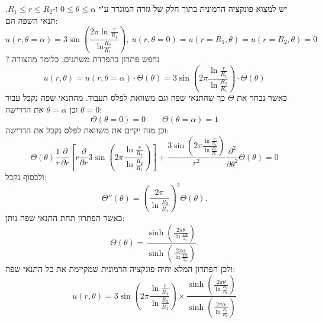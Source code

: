 \documentclass{tstextbook}
\begin{document}
יש למצוא פונקציה הרמונית בתוך חלק של גזרה המוגדר ע"י \(0\leq \theta \leq \alpha\) ו-\(R_{1}\leq r\leq R_{2}\). תנאי השפה הם:
$$ u(r,\theta=\alpha)=3\sin\left(\frac{2\pi\ln\frac r{R_1}}{\mathrm{ln}\frac{R_2}{R_1}}\right),\:u(r,\theta=0)=u(r=R_1,\theta)=u(r=R_2,\theta)=0$$
?
נחפש פתרון בהפרדת משתנים, כלומר מהצורה
$$u\left( r,\theta \right)=u\left( r,\theta=\alpha \right)\cdot\Theta\left( \theta \right)=3\sin\left(2\pi\frac{\ln\frac{r}{R_{1}}}{\ln\frac{R_{2}}{R_{1}}}\right)\cdot\Theta\left(\theta\right)$$
כאשר נבחר את \(\Theta\) כך שהתנאי שפה וגם משוואת לפלס תעבוד. מהתנאי שפה נקבל עבור \(\theta=0\) וכן \(\theta=\alpha\) את הדרישה:
$$\Theta\left( \theta=0 \right)=0\qquad \Theta\left( \theta=\alpha \right)=1$$
וכן מזה יקיים את משוואת לפלס נקבל את הדרישה:
$$ \Theta(\theta)\frac{1}{r}\frac{\partial}{\partial r}\left[r\frac{\partial}{\partial r}3\sin\left(2\pi\frac{\ln\frac{r}{R_{1}}}{\ln\frac{R_{2}}{R_{1}}}\right)\right]+\frac{3\sin\left(2\pi\frac{\ln\frac{r}{R_{1}}}{\ln\frac{R_{2}}{R_{1}}}\right)}{r^{2}}\frac{\partial^{2}}{\partial\theta^{2}}\Theta\left(\theta\right)=0$$
ולבסוף נקבל:
$$ \Theta''\left(\theta\right)=\left(\frac{2\pi}{\ln\frac{R_{2}}{R_{1}}}\right)^{2}\Theta\left(\theta\right).$$
כאשר הפתרון תחת התנאי שפה נותן:
$$ \Theta\left(\theta\right)=\frac{\sinh\left(\frac{2\pi\theta}{\ln\frac{\pi\alpha}{\pi_2}}\right)}{\sinh\left(\frac{2\pi\alpha}{\ln\frac{\pi\alpha}{\pi_2}}\right)}.$$
ולכן הפתרון המלא יהיה פונקציה הרמונית שמקיימת את כל התנאי שפה:
$$ u(r,\theta)=3\sin\left(2\pi\frac{\ln\frac{r}{R_1}}{\ln\frac{R_2}{R_1}}\right)\times\frac{\sinh\left(\frac{2\pi\theta}{\ln\frac{R_2}{R_1}}\right)}{\sinh\left(\frac{2\pi\alpha}{\ln\frac{R_2}{R_1}}\right)}$$
\end{document}

